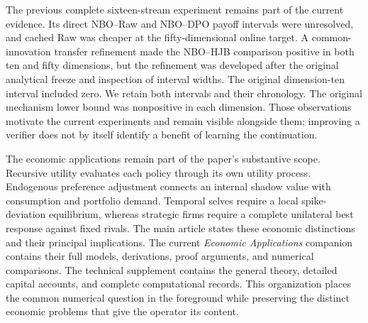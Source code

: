 The previous complete sixteen-stream experiment remains part of the current evidence. Its direct NBO--Raw and NBO--DPO payoff intervals were unresolved, and cached Raw was cheaper at the fifty-dimensional online target. A common-innovation transfer refinement made the NBO--HJB comparison positive in both ten and fifty dimensions, but the refinement was developed after the original analytical freeze and inspection of interval widths. The original dimension-ten interval included zero. We retain both intervals and their chronology. The original mechanism lower bound was nonpositive in each dimension. Those observations motivate the current experiments and remain visible alongside them; improving a verifier does not by itself identify a benefit of learning the continuation.

The economic applications remain part of the paper's substantive scope. Recursive utility evaluates each policy through its own utility process. Endogenous preference adjustment connects an internal shadow value with consumption and portfolio demand. Temporal selves require a local spike-deviation equilibrium, whereas strategic firms require a complete unilateral best response against fixed rivals. The main article states these economic distinctions and their principal implications. The current \emph{Economic Applications} companion contains their full models, derivations, proof arguments, and numerical comparisons. The technical supplement contains the general theory, detailed capital accounts, and complete computational records. This organization places the common numerical question in the foreground while preserving the distinct economic problems that give the operator its content.
